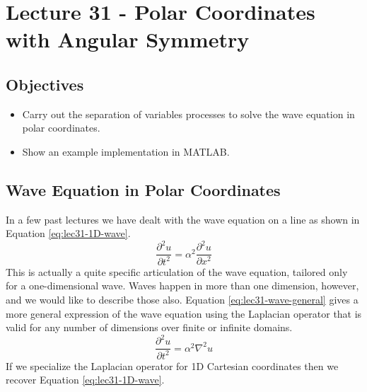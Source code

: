 \chapter{Lecture 31 - Polar Coordinates with Angular Symmetry}
\label{ch:lec31}
\section{Objectives}
\begin{itemize}
\item Carry out the separation of variables processes to solve the wave equation in polar coordinates.
\item Show an example implementation in MATLAB.
\end{itemize}
\setcounter{lstannotation}{0}

\section{Wave Equation in Polar Coordinates}
In a few past lectures we have dealt with the wave equation on a line as shown in Equation \ref{eq:lec31-1D-wave}.
\begin{equation}
\frac{\partial^2 u}{\partial t^2} = \alpha^2 \frac{\partial^2 u}{\partial x^2}
\label{eq:lec31-1D-wave}
\end{equation}
This is actually a quite specific articulation of the wave equation, tailored only for a one-dimensional wave.  Waves happen in more than one dimension, however, and we would like to describe those also.  Equation \ref{eq:lec31-wave-general} gives a more general expression of the wave equation using the Laplacian operator that is valid for any number of dimensions over finite or infinite domains.
\begin{equation}
\frac{\partial^2 u}{\partial t^2} = \alpha^2 \nabla^2 u
\label{eq:lec31-wave-general}
\end{equation}
If we specialize the Laplacian operator for 1D Cartesian coordinates then we recover Equation \ref{eq:lec31-1D-wave}.

